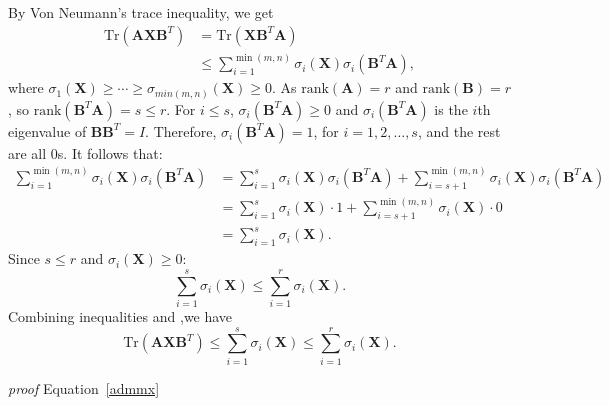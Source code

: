\documentclass{article}
\begin{document}
{By Von Neumann's trace inequality, we get
\begin{equation}
    \begin{aligned}
        \text{Tr}(\mathbf A\mathbf X\mathbf B^T) & = \text{Tr}(\mathbf X\mathbf B^T\mathbf A) \\
        & \leq  \sum_{i=1}^{\min(m,n)} \sigma_i(\mathbf X) \sigma_i(\mathbf B^T\mathbf A),
    \end{aligned}
\end{equation}
where $\sigma_1(\mathbf X) \geq \cdots \geq \sigma_{min(m,n)}(\mathbf X) \geq 0 $. As $\text{rank}(\mathbf A) = r$ and $\text{rank}(\mathbf B) =r$, so $\text{rank}(\mathbf B^T\mathbf A) =s \leq r$. For $i \leq s$, $\sigma_i(\mathbf B^T\mathbf A) \geq 0$ and $\sigma_i(\mathbf B^T\mathbf A)$ is the $i$th eigenvalue of $\mathbf B\mathbf B^T=I$. Therefore, $\sigma_i(\mathbf B^T\mathbf A) = 1$, for $i=1,2,\dots,s$, and the rest are all 0s. It follows that:
\begin{equation}
    \begin{aligned}
        \sum_{i=1}^{\min(m,n)} \sigma_i(\mathbf X) \sigma_i(\mathbf B^T\mathbf A) & = \sum_{i=1}^{s} \sigma_i(\mathbf X) \sigma_i(\mathbf B^T\mathbf A) + \sum_{i=s+1}^{\min(m,n)} \sigma_i(\mathbf X) \sigma_i(\mathbf B^T\mathbf A) \\
        & = \sum_{i=1}^{s} \sigma_i(\mathbf X) \cdot 1 + \sum_{i=s+1}^{\min(m,n)} \sigma_i(\mathbf X) \cdot 0 \\
        & = \sum_{i=1}^{s} \sigma_i(\mathbf X).
    \end{aligned}
\end{equation}
Since $s \leq r$ and $\sigma_i(\mathbf X) \geq 0$:
\begin{equation*}
    \sum_{i=1}^s \sigma_i(\mathbf X)\leq \sum_{i=1}^r \sigma_i(\mathbf X).
\end{equation*}
Combining inequalities and ,we have 
\begin{equation}
    \text{Tr}(\mathbf A\mathbf X\mathbf B^T) \leq \sum_{i=1}^s \sigma_i(\mathbf X)\leq \sum_{i=1}^r \sigma_i(\mathbf X).
\end{equation}


\textit{proof} Equation~\ref{admmx}

}
\end{document}
